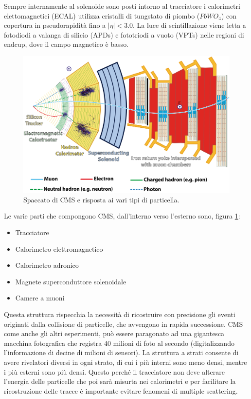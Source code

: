 Sempre internamente al solenoide sono posti intorno al tracciatore i calorimetri elettomagnetici (ECAL) utilizza cristalli di tungstato di piombo ($PbWO_4$) con copertura in pseudorapidità fino a  $|\eta |< 3.0$. La luce di scintillazione viene letta a fotodiodi a valanga di silicio (APDs) e fototriodi a vuoto (VPTs) nelle regioni di endcup, dove il campo magnetico è basso. 
\begin{figure}
\centering
\includegraphics[scale=0.8]{Immagini/CMSbis}
\caption{Spaccato di CMS e risposta ai vari tipi di particella.}
\label{CMSbis}
\end{figure}
Le varie parti che compongono CMS, dall'interno verso l'esterno sono, figura \ref{CMSbis}:

\begin{itemize}
\item Tracciatore

\item Calorimetro elettromagnetico

\item Calorimetro adronico

\item Magnete superconduttore solenoidale

\item Camere a muoni

\end{itemize}

Questa struttura rispecchia la necessità di ricostruire con precisione gli eventi originati dalla collisione di particelle, che avvengono in rapida successione. CMS come anche gli altri esperimenti, può essere paragonato ad una gigantesca macchina fotografica che registra 40 milioni di foto al secondo (digitalizzando l'informazione di decine di milioni di sensori). 
La struttura a strati consente di avere rivelatori diversi in ogni strato, di cui i più interni sono meno densi, mentre i più esterni sono più densi. Questo perché il tracciatore non deve alterare l'energia delle particelle che poi sarà misurta nei calorimetri e per facilitare la ricostruzione delle tracce è importante evitare fenomeni di multiple scattering.

